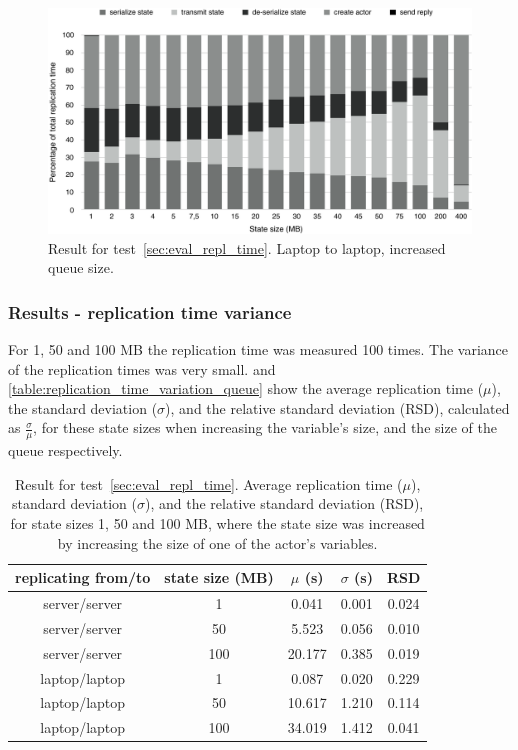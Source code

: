 \documentclass{cslthse-msc}
\begin{document}
\begin{figure}[hbt!]
\centering
\includegraphics[scale=0.5]{images/results/replication_time/laptop_parts_queue.pdf} 
\caption{Result for test~\ref{sec:eval_repl_time}. Laptop to laptop, increased queue size.} \label{fig:replication_time_parts_laptop_queue}
\end{figure}

\subsubsection*{Results - replication time variance}
For 1, 50 and 100 MB the replication time was measured 100 times. The variance of the replication times was very small.  and \cref{table:replication_time_variation_queue} show the average replication time ($\mu$), the standard deviation ($\sigma$), and the relative standard deviation (RSD), calculated as $\frac{\sigma}{\mu}$,  for these state sizes when increasing the variable's size, and the size of the queue respectively.
 
 \begin{table}[h!]
	\begin{center}
	\begin{tabular}{| c | c | c | c | c |}
	 \hline
	 replicating from/to & state size (MB) & $\mu$ (s) & $\sigma$ (s) & RSD \\
	 \hline		%
	  server/server & 1 & 0.041 & 0.001 & 0.024 \\
	  server/server & 50 &  5.523 &  0.056 & 0.010 \\
	  server/server & 100 &  20.177 & 0.385 & 0.019 \\
	  laptop/laptop & 1 & 0.087 & 0.020 & 0.229 \\
	  laptop/laptop & 50 & 10.617 & 1.210 & 0.114 \\
	  laptop/laptop & 100 & 34.019 & 1.412 & 0.041 \\
	   \hline
	\end{tabular}
	 \caption{Result for test~\ref{sec:eval_repl_time}. Average replication time ($\mu$), standard deviation ($\sigma$), and the relative standard deviation (RSD), for state sizes 1, 50 and 100 MB, where the state size was increased by increasing the size of one of the actor's variables.}
	 \label{table:replication_time_variation_variable}
	 \end{center}
 \end{table}
 
\end{document}
